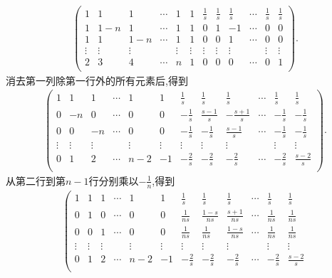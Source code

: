 \documentclass[../../main.tex]{subfiles}%
\begin{document}
\begin{solution}
\begin{gather*}
\left( \begin{matrix}
1&		1&		1&		\cdots&		1&		1&		\frac{1}{s}&		\frac{1}{s}&		\frac{1}{s}&		\cdots&		\frac{1}{s}&		\frac{1}{s}\\
1&		1-n&		1&		\cdots&		1&		1&		0&		1&		-1&		\cdots&		0&		0\\
1&		1&		1-n&		\cdots&		1&		1&		0&		0&		1&		\cdots&		0&		0\\
\vdots&		\vdots&		\vdots&		&		\vdots&		\vdots&		\vdots&		\vdots&		\vdots&		&		\vdots&		\vdots\\
2&		3&		4&		\cdots&		n&		1&		0&		0&		0&		\cdots&		0&		1\\
\end{matrix} \right) .
\end{gather*}
消去第一列除第一行外的所有元素后,得到
\begin{gather*}
\left( \begin{matrix}
1&		1&		1&		\cdots&		1&		1&		\frac{1}{s}&		\frac{1}{s}&		\frac{1}{s}&		\cdots&		\frac{1}{s}&		\frac{1}{s}\\
0&		-n&		0&		\cdots&		0&		0&		-\frac{1}{s}&		\frac{s-1}{s}&		-\frac{s+1}{s}&		\cdots&		-\frac{1}{s}&		-\frac{1}{s}\\
0&		0&		-n&		\cdots&		0&		0&		-\frac{1}{s}&		-\frac{1}{s}&		\frac{s-1}{s}&		\cdots&		-\frac{1}{s}&		-\frac{1}{s}\\
\vdots&		\vdots&		\vdots&		&		\vdots&		\vdots&		\vdots&		\vdots&		\vdots&		&		\vdots&		\vdots\\
0&		1&		2&		\cdots&		n-2&		-1&		-\frac{2}{s}&		-\frac{2}{s}&		-\frac{2}{s}&		\cdots&		-\frac{2}{s}&		\frac{s-2}{s}\\
\end{matrix} \right) .
\end{gather*}
从第二行到第\(n - 1\)行分别乘以\(-\frac{1}{n}\),得到
\begin{gather*}
\left( \begin{matrix}
1&		1&		1&		\cdots&		1&		1&		\frac{1}{s}&		\frac{1}{s}&		\frac{1}{s}&		\cdots&		\frac{1}{s}&		\frac{1}{s}\\
0&		1&		0&		\cdots&		0&		0&		\frac{1}{ns}&		\frac{1-s}{ns}&		\frac{s+1}{ns}&		\cdots&		\frac{1}{ns}&		\frac{1}{ns}\\
0&		0&		1&		\cdots&		0&		0&		\frac{1}{ns}&		\frac{1}{ns}&		\frac{1-s}{ns}&		\cdots&		\frac{1}{ns}&		\frac{1}{ns}\\
\vdots&		\vdots&		\vdots&		&		\vdots&		\vdots&		\vdots&		\vdots&		\vdots&		&		\vdots&		\vdots\\
0&		1&		2&		\cdots&		n-2&		-1&		-\frac{2}{s}&		-\frac{2}{s}&		-\frac{2}{s}&		\cdots&		-\frac{2}{s}&		\frac{s-2}{s}\\

\end{matrix}
\end{gather*}
\end{solution}
\end{document}

